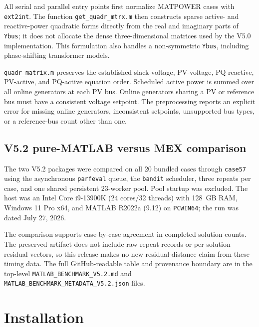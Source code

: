 \documentclass[11pt,a4paper]{article}
\newcommand{\code}[1]{\texttt{#1}}
\begin{document}
All serial and parallel entry points first normalize MATPOWER cases with
\code{ext2int}. The function \code{get_quadr_mtrx.m} then constructs sparse active- and
reactive-power quadratic forms directly from the real and imaginary parts of
\code{Ybus}; it does not allocate the dense three-dimensional matrices used by the V5.0
implementation. This formulation also handles a non-symmetric \code{Ybus}, including
phase-shifting transformer models.

\code{quadr_matrix.m} preserves the established slack-voltage, PV-voltage, PQ-reactive,
PV-active, and PQ-active equation order. Scheduled active power is summed over all online
generators at each PV bus. Online generators sharing a PV or reference bus must have a
consistent voltage setpoint. The preprocessing reports an explicit error for missing
online generators, inconsistent setpoints, unsupported bus types, or a reference-bus
count other than one.

\subsection{V5.2 pure-MATLAB versus MEX comparison}\label{sec:matmex}

The two V5.2 packages were compared on all 20 bundled cases through \code{case57} using
the asynchronous \code{parfeval} queue, the \code{bandit} scheduler, three repeats per
case, and one shared persistent 23-worker pool. Pool startup was excluded. The host was an
Intel Core i9-13900K (24 cores/32 threads) with 128~GB RAM, Windows 11 Pro x64, and MATLAB
R2022a (9.12) on \code{PCWIN64}; the run was dated July 27, 2026.


The comparison supports case-by-case agreement in completed solution counts. The
preserved artifact does not include raw repeat records or per-solution residual vectors,
so this release makes no new residual-distance claim from these timing data. The full
GitHub-readable table and provenance boundary are in the top-level
\code{MATLAB_BENCHMARK_V5.2.md} and \code{MATLAB_BENCHMARK_METADATA_V5.2.json} files.

\section{Installation}
\end{document}
